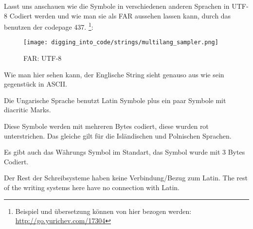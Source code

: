 
Lasst uns anschauen wie die Symbole in verschiedenen anderen Sprachen in UTF-8 Codiert werden und  %
wie man sie als FAR aussehen lassen kann, durch das benutzen der codepage 437.
\footnote{Beispiel und übersetzung können von hier bezogen werden:  
\url{http://go.yurichev.com/17304}}:

\begin{figure}[H]
\centering
\texttt{[image: digging\_into\_code/strings/multilang\_sampler.png]}
\end{figure}

\begin{figure}[H]
\centering
{}
\caption{FAR: UTF-8}
\end{figure}

Wie man hier sehen kann, der Englische String sieht genauso aus wie sein gegenstück in ASCII.

Die Ungarische Sprache benutzt Latin Symbole plus ein paar Symbole mit diacritic Marks. %

Diese Symbole werden mit mehreren Bytes codiert, diese wurden rot unterstrichen.
Das gleiche gilt für die Isländischen und Polnischen Sprachen.

Es gibt auch das  Währungs Symbol im Standart, das Symbol wurde mit 3 Bytes Codiert.

Der Rest der Schreibsysteme haben keine Verbindung/Bezug zum Latin. %
The rest of the writing systems here have no connection with Latin.

